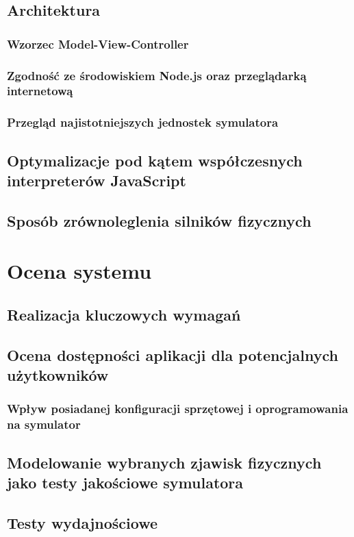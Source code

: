 \documentclass[pdflatex,11pt]{aghdpl}
\begin{document}
	\section{Architektura}
		\subsection{Wzorzec Model-View-Controller}
		\subsection{Zgodność ze środowiskiem Node.js oraz przeglądarką internetową}
		\subsection{Przegląd najistotniejszych jednostek symulatora}
	\section{Optymalizacje pod kątem współczesnych interpreterów JavaScript}
	\section{Sposób zrównoleglenia silników fizycznych}
	
\chapter{Ocena systemu}
	\section{Realizacja kluczowych wymagań}
	\section{Ocena dostępności aplikacji dla potencjalnych użytkowników}
		\subsection{Wpływ posiadanej konfiguracji sprzętowej i oprogramowania na symulator}
	\section{Modelowanie wybranych zjawisk fizycznych jako testy jakościowe symulatora}
	\section{Testy wydajnościowe}
\end{document}
